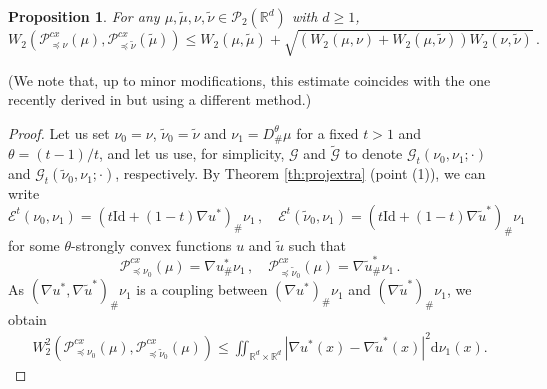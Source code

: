 \documentclass[12pt]{amsart}
\def\ed{\mathrm{d}}
\def\mc#1{\mathcal{#1}}
\newtheorem{proposition}{Proposition}
\begin{document}
\begin{proposition}\label{prop:backwardstab}
For any $\mu, \tilde{\mu}, \nu,\tilde{\nu}\in\mc{P}_2(\mathbb{R}^d)$ with $d \ge 1$,
\[
W_2(\mathscr{P}_{\preceq \nu}^{cx}(\mu),\mathscr{P}_{\preceq \tilde{\nu}}^{cx}(\tilde{\mu}))\leq W_2(\mu,\tilde{\mu}) + \sqrt{(W_2(\mu,\nu) + W_2(\mu,\tilde{\nu}))W_2(\nu,\tilde{\nu})}\,.
\]
\end{proposition}
{(We note that, up to minor modifications, this estimate coincides with the one recently derived in \cite[Proposition 2.9]{alfonsi2025wasserstein} but using a different method.)}
\begin{proof} Let us set $\nu_0 =\nu$, $\tilde{\nu}_0=\tilde{\nu}$ and $\nu_1 = D^\theta_\# \mu$ for a fixed $t>1$ and $\theta=(t-1)/t$, and let us use, for simplicity, $\mc{G}$ and $\tilde{\mc{G}}$ to denote $\mc{G}_t(\nu_0,\nu_1;\cdot)$ and $\mc{G}_t(\tilde{\nu}_0,{\nu}_1;\cdot)$, respectively. By Theorem \ref{th:projextra} (point (1)), 
we can write
\[
 \mathscr{E}^t(\nu_0,\nu_1) = (t\mathrm{Id} +(1-t) \nabla u^*)_\# \nu_1\,, \quad  \mathscr{E}^t(\tilde{\nu}_0,\nu_1) = (t\mathrm{Id}+(1-t)  \nabla \tilde{u}^* )_\# \nu_1\,
\]
for some $\theta$-strongly convex functions $u$ and $\tilde{u}$ such that 
\begin{equation}\label{eq:backward}
    \mathscr{P}^{cx}_{\preceq \nu_0}(\mu) = \nabla u^*_\# \nu_1\,, \quad \mathscr{P}^{cx}_{\preceq \tilde{\nu}_0}(\mu) = \nabla \tilde{u}^*_\# \nu_1\,.
\end{equation}
As $(\nabla u^*,\nabla \tilde u^*)_\# \nu_1$ is a coupling between $(\nabla u^*)_\# \nu_1$ and $(\nabla \tilde{u}^*)_\# \nu_1$, we obtain
\begin{align}\label{eq:Wass-u-tilde-u}
W_2^2(\mathscr{P}^{cx}_{\preceq \nu_0}(\mu),\mathscr{P}^{cx}_{\preceq \tilde{\nu}_0}(\mu))   \le \iint_{\mathbb{R}^d\times \mathbb{R}^d} |\nabla u^*(x)-\nabla \tilde{u}^*(x)|^2\ed \nu_1(x).
\end{align}


\end{proof}
\end{document}
